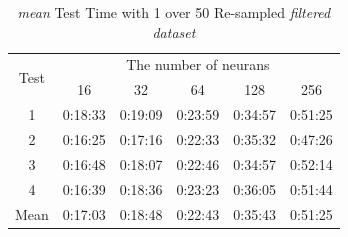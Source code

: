 \documentclass[draft,dvipsnames]{drexel-thesis}
\begin{document}
\begin{thesis}
\begin{table}[!t]
\centering
\caption{{\em mean} Test Time with 1 over 50 Re-sampled {\em filtered dataset}}
\label{tbl:mean_1_50_time}
\begin{tabular}{|c|c|c|c|c|c|}
\hline
\multirow{2}{*}{Test}      & \multicolumn{5}{c|}{The number of neurans}                                                                                                               \\ \cline{2-6} 
                           & 16                           & 32                           & 64                           & 128                          & 256                          \\ \hline
1                          & 0:18:33                      & 0:19:09                      & 0:23:59                      & 0:34:57                      & 0:51:25                      \\ \hline
2                          & 0:16:25                      & 0:17:16                      & 0:22:33                      & 0:35:32                      & 0:47:26                      \\ \hline
3                          & 0:16:48                      & 0:18:07                      & 0:22:46                      & 0:34:57                      & 0:52:14                      \\ \hline
4                          & 0:16:39                      & 0:18:36                      & 0:23:23                      & 0:36:05                      & 0:51:44                      \\ \hline
\multicolumn{1}{|l|}{Mean} & \multicolumn{1}{l|}{0:17:03} & \multicolumn{1}{l|}{0:18:48} & \multicolumn{1}{l|}{0:22:43} & \multicolumn{1}{l|}{0:35:43} & \multicolumn{1}{l|}{0:51:25} \\ \hline
\end{tabular}
\end{table}


\end{thesis}
\end{document}
